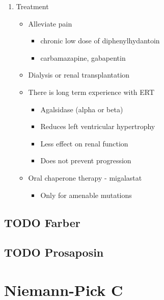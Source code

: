 \documentclass{scrartcl}
\begin{document}
\begin{enumerate}
\item Treatment
\label{sec:orgfdc8111}
\begin{itemize}
\item Alleviate pain
\begin{itemize}
\item chronic low dose of diphenylhydantoin
\item carbamazapine, gabapentin
\end{itemize}
\item Dialysis or renal transplantation
\item There is long term experience with ERT
\begin{itemize}
\item Agalsidase (alpha or beta)
\item Reduces left ventricular hypertrophy
\item Less effect on renal function
\item Does not prevent progression
\end{itemize}
\item Oral chaperone therapy - migalastat
\begin{itemize}
\item Only for amenable mutations
\end{itemize}
\end{itemize}
\end{enumerate}

\subsection{{\bfseries\sffamily TODO} Farber}
\label{sec:org66855ee}

\subsection{{\bfseries\sffamily TODO} Prosaposin}
\label{sec:org2493aec}


\section{Niemann-Pick C}
\label{sec:orgd7f088f}
\end{document}
